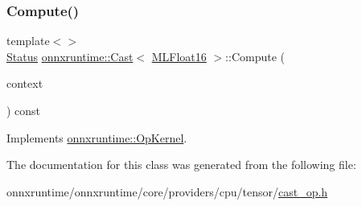 \subsubsection{\texorpdfstring{Compute()}{Compute()}\hspace{0.1cm}{\footnotesize\ttfamily [2/2]}}
{\footnotesize\ttfamily template$<$$>$ \\
\mbox{\hyperlink{classonnxruntime_1_1common_1_1Status}{Status}} \mbox{\hyperlink{classonnxruntime_1_1Cast}{onnxruntime\+::\+Cast}}$<$ \mbox{\hyperlink{uniononnxruntime_1_1MLFloat16}{M\+L\+Float16}} $>$\+::Compute (\begin{DoxyParamCaption}\item[{\mbox{\hyperlink{classonnxruntime_1_1OpKernelContext}{Op\+Kernel\+Context}} $\ast$}]{context }\end{DoxyParamCaption}) const\hspace{0.3cm}{\ttfamily [virtual]}}



Implements \mbox{\hyperlink{classonnxruntime_1_1OpKernel_a9eca8656a78b1b3ab9d3351a12798650}{onnxruntime\+::\+Op\+Kernel}}.



The documentation for this class was generated from the following file\+:\begin{DoxyCompactItemize}
\item 
onnxruntime/onnxruntime/core/providers/cpu/tensor/\mbox{\hyperlink{cpu_2tensor_2cast__op_8h}{cast\+\_\+op.\+h}}\end{DoxyCompactItemize}
